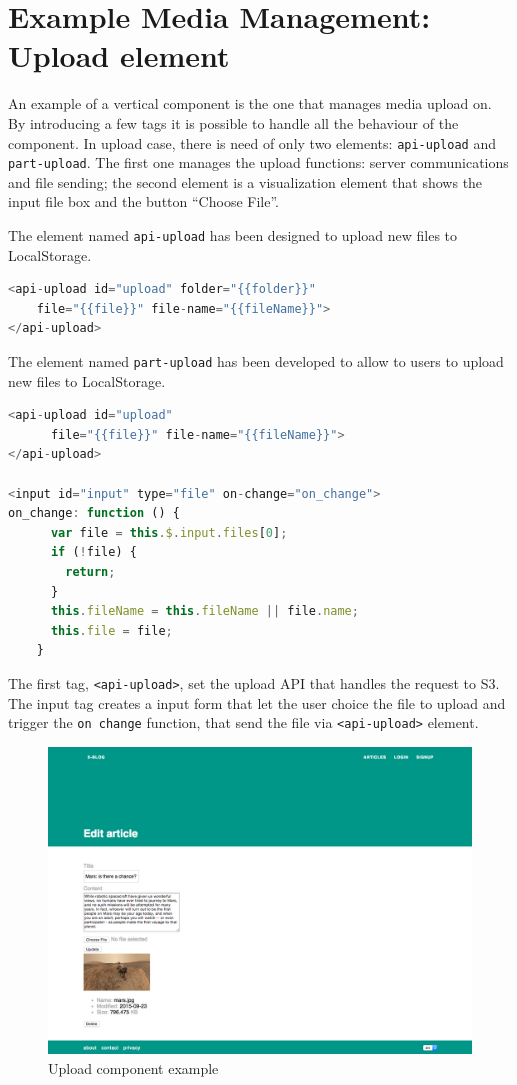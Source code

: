 \section{Example Media Management: Upload element}
\label{sec:XPR_exmpl_b}

An example of a vertical component is the one that manages media upload on. By introducing a few tags it is possible to handle all the behaviour of the component. In upload case, there is need of only two elements: \texttt{api-upload} and \texttt{part-upload}.
The first one manages the upload functions: server communications and file sending; the second element is a visualization element that shows the input file box and the button ``Choose File''.


The element named \texttt{api-upload} has been designed to upload new files to LocalStorage.
\begin{lstlisting}[language=javascript]
<api-upload id="upload" folder="{{folder}}"
	file="{{file}}" file-name="{{fileName}}">
</api-upload>
\end{lstlisting} 


The element named \texttt{part-upload} has been developed to allow to users to upload new files to LocalStorage.

\begin{lstlisting}[language=javascript]
<api-upload id="upload"
      file="{{file}}" file-name="{{fileName}}">
</api-upload>

<input id="input" type="file" on-change="on_change">
on_change: function () {
      var file = this.$.input.files[0];
      if (!file) {
        return;
      }
      this.fileName = this.fileName || file.name;
      this.file = file;
    }

\end{lstlisting}

The first tag, \texttt{<api-upload>}, set the upload API that handles the request to S3.
The input tag creates a input form that let the user choice the file to upload and trigger the \texttt{on change} function, that send the file via \texttt{<api-upload>} element.



\begin {figure}[h]
\graphicspath{{images/chapter_s3/}}
\includegraphics[width=\textwidth]{s3_example}
\caption{Upload component example}
\end {figure}
